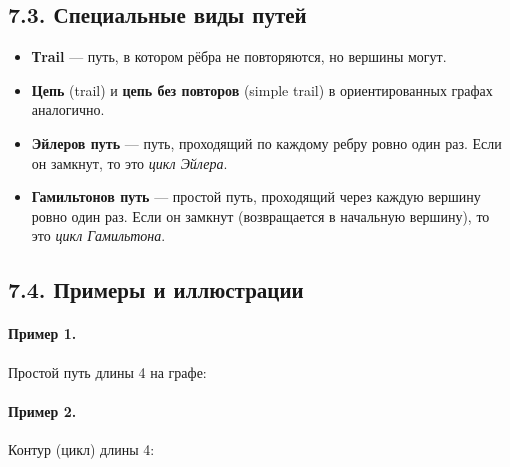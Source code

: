 \documentclass{article}
\begin{document}
\subsection*{7.3. Специальные виды путей}

\begin{itemize}[leftmargin=*]
  \item \textbf{Тrail} — путь, в котором рёбра не повторяются, но вершины могут.
  \item \textbf{Цепь} (trail) и \textbf{цепь без повторов} (simple trail) в ориентированных графах аналогично.
  \item \textbf{Эйлеров путь} — путь, проходящий по каждому ребру ровно один раз. Если он замкнут, то это \emph{цикл Эйлера}.
  \item \textbf{Гамильтонов путь} — простой путь, проходящий через каждую вершину ровно один раз. Если он замкнут (возвращается в начальную вершину), то это \emph{цикл Гамильтона}.
\end{itemize}

\subsection*{7.4. Примеры и иллюстрации}

\paragraph{Пример 1.} Простой путь длины 4 на графе:

\begin{center}
\end{center}

\paragraph{Пример 2.} Контур (цикл) длины 4:

\begin{center}
\end{center}
\end{document}
